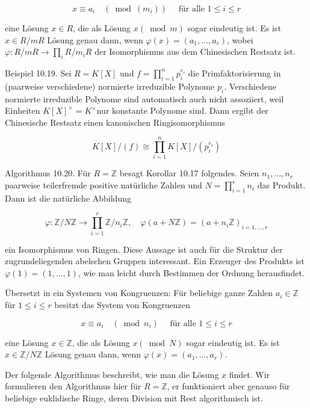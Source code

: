 \documentclass[10pt, letterpaper]{article}
\begin{document}
$$
x \equiv a_{i} \quad\left(\bmod \left(m_{i}\right)\right) \quad \text { für alle } 1 \leq i \leq r
$$

eine Lösung $x \in R$, die als Lösung $x(\bmod m)$ sogar eindeutig ist. Es ist $x \in R / m R$ Lösung genau dann, wenn $\varphi(x)=\left(a_{1}, \ldots, a_{r}\right)$, wobei $\varphi: R / m R \rightarrow \prod_{i} R / m_{i} R$ der Isomorphismus aus dem Chinesischen Restsatz ist.

Beispiel 10.19. Sei $R=K[X]$ und $f=\prod_{i=1}^{n} p_{i}^{e_{i}}$ die Primfaktorisierung in (paarweise verschiedene) normierte irreduzible Polynome $p_{i}$. Verschiedene normierte irreduzible Polynome sind automatisch auch nicht assoziiert, weil Einheiten $K[X]^{\times}=K^{\times}$nur konstante Polynome sind. Dann ergibt der Chinesische Restsatz einen kanonischen Ringisomorphismus

$$
K[X] /(f) \cong \prod_{i=1}^{n} K[X] /\left(p_{i}^{e_{i}}\right)
$$

Algorithmus 10.20. Für $R=\mathbb{Z}$ besagt Korollar 10.17 folgendes. Seien $n_{1}, \ldots, n_{r}$ paarweise teilerfremde positive natürliche Zahlen und $N=\prod_{i=1}^{r} n_{i}$ das Produkt. Dann ist die natürliche Abbildung

$$
\varphi: \mathbb{Z} / N \mathbb{Z} \rightarrow \prod_{i=1}^{r} \mathbb{Z} / n_{i} \mathbb{Z}, \quad \varphi(a+N \mathbb{Z})=\left(a+n_{i} \mathbb{Z}\right)_{i=1, \ldots, r}
$$

ein Isomorphismus von Ringen. Diese Aussage ist auch für die Struktur der zugrundeliegenden abelschen Gruppen interessant. Ein Erzeuger des Produkts ist $\varphi(1)=(1, \ldots, 1)$, wie man leicht durch Bestimmen der Ordnung herausfindet.

Übersetzt in ein Systemen von Kongruenzen: Für beliebige ganze Zahlen $a_{i} \in \mathbb{Z}$ für $1 \leq i \leq r$ besitzt das System von Kongruenzen

$$
x \equiv a_{i} \quad\left(\bmod n_{i}\right) \quad \text { für alle } 1 \leq i \leq r
$$

eine Lösung $x \in \mathbb{Z}$, die als Lösung $x(\bmod N)$ sogar eindeutig ist. Es ist $x \in \mathbb{Z} / N \mathbb{Z}$ Lösung genau dann, wenn $\varphi(x)=\left(a_{1}, \ldots, a_{r}\right)$.

Der folgende Algorithmus beschreibt, wie man die Lösung $x$ findet. Wir formulieren den Algorithmus hier für $R=\mathbb{Z}$, er funktioniert aber genauso für beliebige euklidische Ringe, deren Division mit Rest algorithmisch ist.
\end{document}
